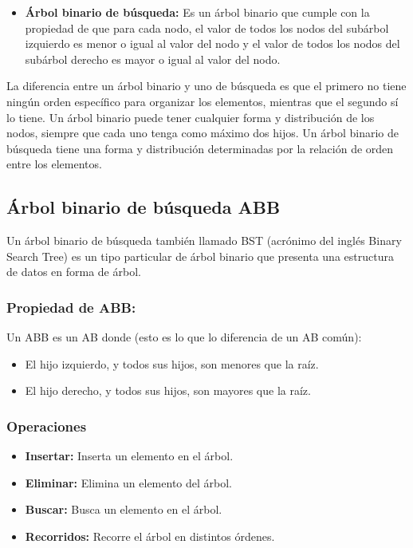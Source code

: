 \documentclass[../main.tex]{subfiles}
\begin{document}
        \begin{itemize}
            \item \textbf{Árbol binario de búsqueda:} Es un árbol binario que cumple con la propiedad de que para cada nodo, el valor de todos los nodos del subárbol izquierdo es menor o igual al valor del nodo y el valor de todos los nodos del subárbol derecho es mayor o igual al valor del nodo.
        \end{itemize}
        
        La diferencia entre un árbol binario y uno de búsqueda es que el primero no tiene ningún orden específico para organizar los elementos, mientras que el segundo sí lo tiene. Un árbol binario puede tener cualquier forma y distribución de los nodos, siempre que cada uno tenga como máximo dos hijos. Un árbol binario de búsqueda tiene una forma y distribución determinadas por la relación de orden entre los elementos.

    \subsection{Árbol binario de búsqueda ABB}
        Un árbol binario de búsqueda también llamado BST (acrónimo del inglés Binary Search Tree) es un tipo particular de árbol binario que presenta una estructura de datos en forma de árbol.

        \subsubsection{Propiedad de ABB:} 
            Un ABB es un AB donde (esto es lo que lo diferencia de un AB común):
            \begin{itemize}
                \item El hijo izquierdo, y todos sus hijos, son menores que la raíz.
                \item El hijo derecho, y todos sus hijos, son mayores que la raíz.
            \end{itemize}


        \subsubsection{Operaciones}
            \begin{itemize}
                \item \textbf{Insertar:} Inserta un elemento en el árbol.
                \item \textbf{Eliminar:} Elimina un elemento del árbol.
                \item \textbf{Buscar:} Busca un elemento en el árbol.
                \item \textbf{Recorridos:} Recorre el árbol en distintos órdenes.
            \end{itemize}
\end{document}

